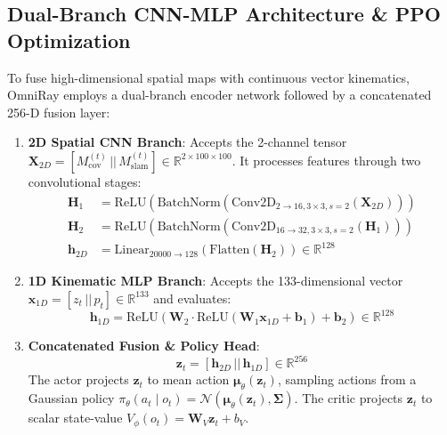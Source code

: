 \documentclass[11pt,a4paper]{article}
\begin{document}
\subsection{Dual-Branch CNN-MLP Architecture \& PPO Optimization}

To fuse high-dimensional spatial maps with continuous vector kinematics, OmniRay employs a dual-branch encoder network followed by a concatenated 256-D fusion layer:

\begin{enumerate}
    \item \textbf{2D Spatial CNN Branch}: Accepts the 2-channel tensor $\mathbf{X}_{2D} = [M_{\text{cov}}^{(t)} \,||\, M_{\text{slam}}^{(t)}] \in \mathbb{R}^{2 \times 100 \times 100}$. It processes features through two convolutional stages:
    \begin{align}
        \mathbf{H}_1 &= \text{ReLU}\left( \text{BatchNorm}\left( \text{Conv2D}_{2 \to 16, 3\times3, s=2}(\mathbf{X}_{2D}) \right) \right) \\
        \mathbf{H}_2 &= \text{ReLU}\left( \text{BatchNorm}\left( \text{Conv2D}_{16 \to 32, 3\times3, s=2}(\mathbf{H}_1) \right) \right) \\
        \mathbf{h}_{2D} &= \text{Linear}_{20000 \to 128}\left( \text{Flatten}(\mathbf{H}_2) \right) \in \mathbb{R}^{128}
    \end{align}

    \item \textbf{1D Kinematic MLP Branch}: Accepts the 133-dimensional vector $\mathbf{x}_{1D} = [z_t \,||\, p_t] \in \mathbb{R}^{133}$ and evaluates:
    \begin{equation}
        \mathbf{h}_{1D} = \text{ReLU}\left( \mathbf{W}_2 \cdot \text{ReLU}\left( \mathbf{W}_1 \mathbf{x}_{1D} + \mathbf{b}_1 \right) + \mathbf{b}_2 \right) \in \mathbb{R}^{128}
    \end{equation}

    \item \textbf{Concatenated Fusion \& Policy Head}:
    \begin{equation}
        \mathbf{z}_t = [\mathbf{h}_{2D} \,||\, \mathbf{h}_{1D}] \in \mathbb{R}^{256}
    \end{equation}
    The actor projects $\mathbf{z}_t$ to mean action $\boldsymbol{\mu}_\theta(\mathbf{z}_t)$, sampling actions from a Gaussian policy $\pi_\theta(a_t \mid o_t) = \mathcal{N}(\boldsymbol{\mu}_\theta(\mathbf{z}_t), \boldsymbol{\Sigma})$. The critic projects $\mathbf{z}_t$ to scalar state-value $V_\phi(o_t) = \mathbf{W}_V \mathbf{z}_t + b_V$.
\end{enumerate}
\end{document}
